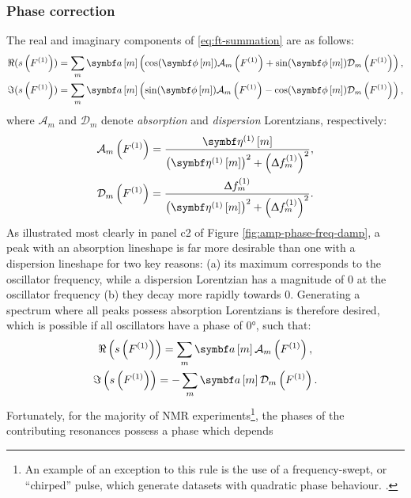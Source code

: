 \subsubsection{Phase correction}
The real and imaginary components of \eqref{eq:ft-summation} are as follows:
\begin{subequations}
    \begin{gather}
        \Re(s\left(\Fone\right)) = \sum_m
        \bdam \left(\cos(\bdphim) \mathcal{A}_m\left(\Fone\right) + \sin(\bdphim) \mathcal{D}_m\left(\Fone\right)\right),\\
        \Im(s\left(\Fone\right)) = \sum_m
        \bdam \left(\sin(\bdphim) \mathcal{A}_m\left(\Fone\right) - \cos(\bdphim) \mathcal{D}_m\left(\Fone\right)\right),
    \end{gather}
\end{subequations}
where $\mathcal{A}_m$ and  $\mathcal{D}_m$ denote \emph{absorption} and
\emph{dispersion} Lorentzians, respectively:
\begin{subequations}
    \begin{gather}
        \mathcal{A}_m\left(\Fone\right) = \frac{\bdetaonem}{\left(\bdetaonem\right)^2 + \left( \Updelta f^{(1)}_m \right)^2},\\
        \mathcal{D}_m\left(\Fone\right) = \frac{\Updelta f^{(1)}_m}{\left(\bdetaonem\right)^2 + \left( \Updelta f^{(1)}_m \right)^2}.
    \end{gather}
\end{subequations}
As illustrated most clearly in panel c2 of Figure
\ref{fig:amp-phase-freq-damp}, a peak with an absorption lineshape is far more
desirable than one with a dispersion lineshape for two key
reasons: (a) its maximum corresponds to the oscillator frequency, while a
dispersion Lorentzian has a magnitude of $0$ at the oscillator frequency (b)
they decay more rapidly towards $0$. Generating a spectrum where all peaks
possess absorption Lorentzians is therefore desired, which is possible if all
oscillators have a phase of \ang{0}, such that:
\begin{subequations}
    \begin{gather}
        \Re\left(s\left(\Fone\right)\right) = \sum_m \bdam \mathcal{A}_m\left(\Fone\right),\label{eq:absorption}\\
        \Im\left(s\left(\Fone\right)\right) = -\sum_m \bdam \mathcal{D}_m\left(\Fone\right).\label{eq:dispersion}
    \end{gather}
\end{subequations}
 Fortunately, for the majority of \ac{NMR} experiments\footnote{
    An example of an exception to this rule is the use of a frequency-swept, or
    ``chirped'' pulse, which generate datasets with quadratic phase behaviour.
    .
}, the phases of the contributing resonances possess a phase which depends
